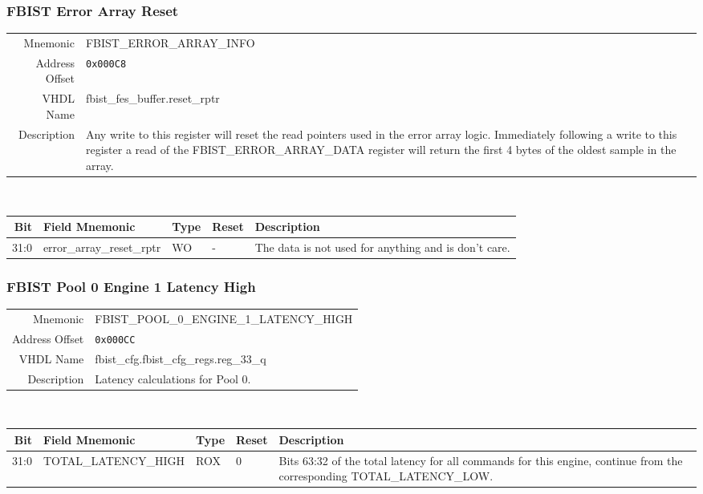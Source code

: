 \subsubsection{FBIST Error Array Reset}
\begin{tabular}{ r | p{350px} }
  Mnemonic       & FBIST\_ERROR\_ARRAY\_INFO      \\
  Address Offset & \texttt{0x000C8}               \\
  VHDL Name      & fbist\_fes\_buffer.reset\_rptr \\ \hline

  Description &
  Any write to this register will reset the read pointers used in the
  error array logic. Immediately following a write to this register a
  read of the FBIST\_ERROR\_ARRAY\_DATA register will return the first
  4 bytes of the oldest sample in the array. \\
\end{tabular}
\\
\begin{tabularx}{\textwidth}{r|l|l|l|X}
  \hline
  Bit   & Field Mnemonic            & Type & Reset & Description \\ \hline

  31:0  & error\_array\_reset\_rptr & WO   & -     &

  The data is not used for anything and is don't care. \\
\end{tabularx}

\subsubsection{FBIST Pool 0 Engine 1 Latency High}
\begin{tabular}{ r | p{350px} }
  Mnemonic       & FBIST\_POOL\_0\_ENGINE\_1\_LATENCY\_HIGH \\
  Address Offset & \texttt{0x000CC}                         \\
  VHDL Name      &  fbist\_cfg.fbist\_cfg\_regs.reg\_33\_q  \\ \hline

  Description &
  Latency calculations for Pool 0. \\
\end{tabular}
\\
\begin{tabularx}{\textwidth}{r|l|l|l|X}
  \hline
  Bit   & Field Mnemonic       & Type & Reset & Description \\ \hline

  31:0  & TOTAL\_LATENCY\_HIGH & ROX  & 0     &

  Bits 63:32 of the total latency for all commands for this engine,
  continue from the corresponding TOTAL\_LATENCY\_LOW. \\
\end{tabularx}

